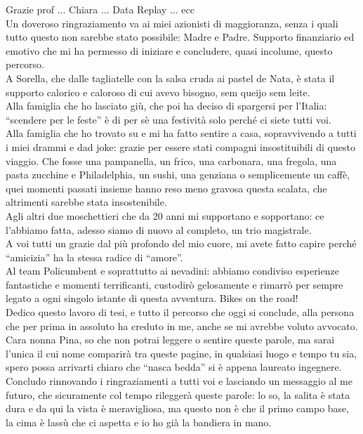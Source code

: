 
Grazie prof ... Chiara ... Data Replay ... ecc
\bigskip
\\
Un doveroso ringraziamento va ai miei azionisti di maggioranza, senza i quali tutto questo non sarebbe stato possibile: Madre e Padre. Supporto finanziario ed emotivo che mi ha permesso di iniziare e concludere, quasi incolume, questo percorso.
\bigskip
\\
A Sorella, che dalle tagliatelle con la salsa cruda ai pastel de Nata, è stata il supporto calorico e caloroso di cui avevo bisogno, sem queijo sem leite.
\bigskip
\\
Alla famiglia che ho lasciato giù, che poi ha deciso di spargersi per l'Italia: ``scendere per le feste'' è di per sè una festività solo perché ci siete tutti voi.
\bigskip
\\
Alla famiglia che ho trovato su e mi ha fatto sentire a casa, sopravvivendo a tutti i miei drammi e dad joke: grazie per essere stati compagni insostituibili di questo viaggio. Che fosse una pampanella, un frico, una carbonara, una fregola, una pasta zucchine e Philadelphia, un sushi, una genziana o semplicemente un caffè, quei momenti passati insieme hanno reso meno gravosa questa scalata, che altrimenti sarebbe stata insostenibile.
\bigskip
\\
Agli altri due moschettieri che da 20 anni mi supportano e sopportano: ce l'abbiamo fatta, adesso siamo di nuovo al completo, un trio magistrale.
\bigskip
\\
A voi tutti un grazie dal più profondo del mio cuore, mi avete fatto capire perché ``amicizia'' ha la stessa radice di ``amore''.
\bigskip
\\
Al team Policumbent e soprattutto ai nevadini: abbiamo condiviso esperienze fantastiche e momenti terrificanti, custodirò gelosamente e rimarrò per sempre legato a ogni singolo istante di questa avventura. Bikes on the road!
\bigskip
\\
Dedico questo lavoro di tesi, e tutto il percorso che oggi si conclude, alla persona che per prima in assoluto ha creduto in me, anche se mi avrebbe voluto avvocato. Cara nonna Pina, so che non potrai leggere o sentire queste parole, ma sarai l'unica il cui nome comparirà tra queste pagine, in qualsiasi luogo e tempo tu sia, spero possa arrivarti chiaro che ``nasca bedda'' si è appena laureato ingegnere.
\bigskip
\\
Concludo rinnovando i ringraziamenti a tutti voi e lasciando un messaggio al me futuro, che sicuramente col tempo rileggerà queste parole: lo so, la salita è stata dura e da qui la vista è meravigliosa, ma questo non è che il primo campo base, la cima è lassù che ci aspetta e io ho già la bandiera in mano.